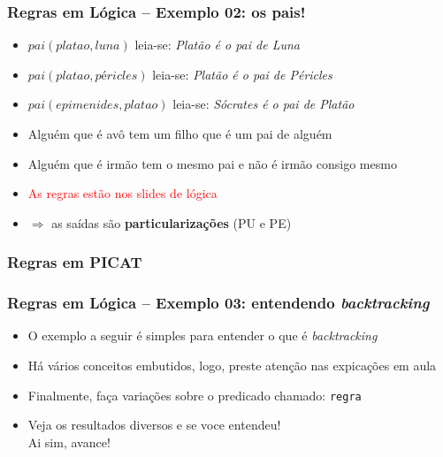 \documentclass[10pt]{beamer}
\begin{document}
\begin{frame}
    \frametitle{Regras  em Lógica -- Exemplo 02: os pais!}
    \begin{itemize}
    
    \item $pai(platao, luna)$ \hspace{1.5cm} leia-se: \textit{Platão é o pai de Luna}
    \item $pai(platao, péricles)$ \hspace{1.5cm} leia-se: \textit{Platão é o pai de Péricles}
    \item $pai(epimenides, platao)$ \hspace{1.5cm} leia-se: \textit{Sócrates é o pai de Platão}
    
    \pause
    
    \item Alguém que é avô tem um filho que é um pai de alguém
    \pause
    
    \item Alguém que é irmão tem o mesmo pai e não é irmão consigo mesmo
    \pause
    
    \item \textcolor{red}{As regras estão nos slides de lógica}

    \item  $\Rightarrow $ as saídas são \textbf{particularizações} (PU e PE)
 
    \end{itemize}
\end{frame}

\begin{frame}[allowframebreaks=0.9]
 \frametitle{Regras em PICAT}



\end{frame}


\begin{frame}
    \frametitle{Regras  em Lógica -- Exemplo 03: entendendo \textit{backtracking}}
   
   \begin{itemize}
    \item O exemplo a seguir é simples para entender o que é \textit{backtracking}
    \pause

    \item Há vários conceitos embutidos, logo, preste atenção nas 
    expicações em aula
    
        \pause
     \item Finalmente, faça variações sobre    o predicado
     chamado: \texttt{regra}

     \pause
     \item Veja os resultados diversos e se voce entendeu!\\
     Ai sim, avance!    
    \end{itemize}
\end{frame}
\end{document}
